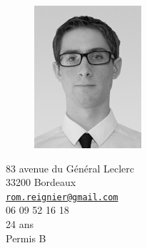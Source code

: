 \documentclass[a4paper,11pt,final]{memoir}
\begin{document}
\begin{figure}
	\hfill
	\includegraphics[width=0.5\columnwidth]{../IMG_7936-Modifier_cv}
	\vspace{-0.5cm}
\end{figure}

\begin{flushright}\small
	83 avenue du Général Leclerc\\
	33200 Bordeaux\\
	{\href{mailto:rom.reignier@gmail.com}{\nolinkurl{rom.reignier@gmail.com}}}\\
	06 09 52 16 18\\
	24 ans\\
	Permis B
\end{flushright}%
\end{document}
